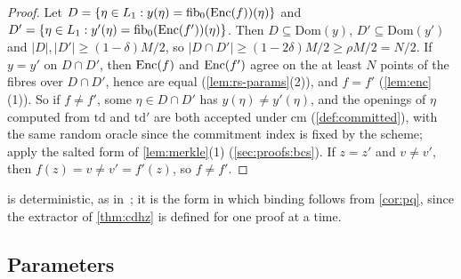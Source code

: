 \begin{proof}
Let $D = \{\eta \in L_1 : y(\eta) = \mathrm{fib}_0(\mathrm{Enc}(f))(\eta)\}$ and $D' = \{\eta \in L_1 : y'(\eta) = \mathrm{fib}_0(\mathrm{Enc}(f'))(\eta)\}$. Then $D \subseteq \mathrm{Dom}(y)$, $D' \subseteq \mathrm{Dom}(y')$ and $|D|, |D'| \ge (1-\delta)M/2$, so $|D \cap D'| \ge (1-2\delta)M/2 \ge \rho M/2 = N/2$.
If $y = y'$ on $D \cap D'$, then $\mathrm{Enc}(f)$ and $\mathrm{Enc}(f')$ agree on the at least $N$ points of the fibres over $D \cap D'$, hence are equal (\cref{lem:rs-params}(2)), and $f = f'$ (\cref{lem:enc}(1)).
So if $f \ne f'$, some $\eta \in D \cap D'$ has $y(\eta) \ne y'(\eta)$, and the openings of $\eta$ computed from $\mathrm{td}$ and $\mathrm{td}'$ are both accepted under $\mathrm{cm}$ (\cref{def:committed}), with the same random oracle since the commitment index is fixed by the scheme; apply the salted form of \cref{lem:merkle}(1) (\cref{sec:proofs:bcs}).
If $z = z'$ and $v \ne v'$, then $f(z) = v \ne v' = f'(z)$, so $f \ne f'$.
\end{proof}

 is deterministic, as in~\cite{Mkh26}; it is the form in which binding follows from \cref{cor:pq}, since the extractor of \cref{thm:cdhz} is defined for one proof at a time.

\subsection{Parameters}\label{sec:pq:params}

